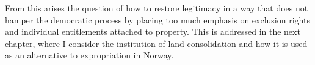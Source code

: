 From this arises the question of how to restore legitimacy in a way that does not hamper the democratic process by placing too much emphasis on exclusion rights and individual entitlements attached to property. This is addressed in the next chapter, where I consider the institution of land consolidation and how it is used as an alternative to expropriation in Norway.%